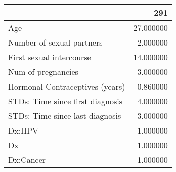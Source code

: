 \begin{tabular}{lr}
\toprule
 & 291 \\
\midrule
Age & 27.000000 \\
Number of sexual partners & 2.000000 \\
First sexual intercourse & 14.000000 \\
Num of pregnancies & 3.000000 \\
Hormonal Contraceptives (years) & 0.860000 \\
STDs: Time since first diagnosis & 4.000000 \\
STDs: Time since last diagnosis & 3.000000 \\
Dx:HPV & 1.000000 \\
Dx & 1.000000 \\
Dx:Cancer & 1.000000 \\
\bottomrule
\end{tabular}
